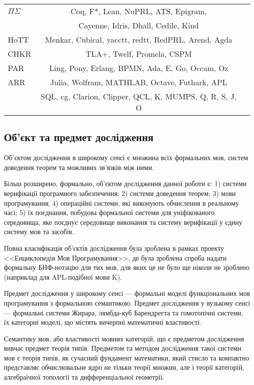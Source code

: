 \begin{table}[ht]
\begin{tabular}{lcc}
    \hline
       $\Pi\Sigma$ & Coq, F*, Lean, NuPRL, ATS, Epigram, \\
          & Cayenne, Idris, Dhall, Cedile, Kind \\
    \hline
       HoTT & Menkar, Cubical, yacctt, redtt, RedPRL, Arend, Agda \\
    \hline
       CHKR & TLA+, Twelf, Promela, CSPM \\
    \hline
       PAR & Ling, Pony, Erlang, BPMN, Ada, E, Go, Occam, Oz \\
    \hline
       ARR & Julia, Wolfram, MATHLAB, Octave, Futhark, APL \\
           & SQL, cg, Clarion, Clipper, QCL, K, MUMPS, Q, R, S, J, O \\
    \hline
  \end{tabular}
\end{table}

\newpage
\subsection{Об'єкт та предмет дослідження}
Об'єктом дослідження в широкому сенсі є множина
всіх формальних мов, систем доведення теорем та можливих зв'язків між ними.

Більш розширено, формально, об'єктом дослідження данної роботи є:
1) системи верифікації програмного забезпечення;
2) системи доведення теорем;
3) мови програмування;
4) операційні системи, які виконують обчислення в реальному часі;
5) їх поєднання, побудова формальної системи для
уніфікованого середовища, яке поєднує середовище
виконання та систему верифікації у єдину систему мов та засобів.

Повна класифікація об'єктів дослідження була зроблена в рамках проекту
<<Енциклопедія Мов Програмування>>, де була зроблена спроба надати
формальну БНФ-нотацію для тих мов, для яких це не було ще ніколи
не зроблено (наприклад для APL-подібної мови K).

Предмет дослідження у широкому сенсі --- формальні моделі функціональних
мов програмування з формальною семантикою. Предмет дослідження у
вузькому сенсі --- формальні системи Жирара, лямбда-куб Барендрегта
та гомотопічні системи, їх категорні моделі, що містять вичерпні
математичні властивості.

Семантику мов, або властивості мовних категорій, що є предметом
дослідження вивчає предмет теорія типів. Предметом та методом
дослідження такої системи мов є теорія типів, як сучасний фундамент
математики, який стисло та компактно представляє обчислювальне ядро
не тільки теорії множин, але і теорії категорій, алгебраїчної
топології та дифференціальної геометрії.


